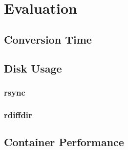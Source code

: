 \chapter{Evaluation}
\section{Conversion Time}
\section{Disk Usage}
\subsection{rsync}
\subsection{rdiffdir}
\section{Container Performance}